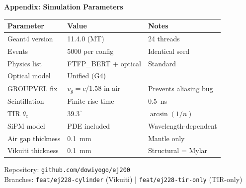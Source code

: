 \documentclass[aspectratio=169,10pt]{beamer}
\begin{document}
\begin{frame}[plain]
  \begin{center}
    \Large\textbf{Appendix: Simulation Parameters}
  \end{center}

  \renewcommand{\arraystretch}{1.2}
  \begin{tabular}{@{}lll@{}}
    \toprule
    Parameter & Value & Notes \\
    \midrule
    Geant4 version   & 11.4.0 (MT) & 24 threads \\
    Events           & 5000 per config & Identical seed \\
    Physics list     & FTFP\_BERT + optical & Standard \\
    Optical model    & Unified (G4) & \\
    GROUPVEL fix     & $v_g = c/1.58$ in air & Prevents aliasing bug \\
    Scintillation    & Finite rise time & \SI{0.5}{ns} \\
    TIR $\theta_c$   & $39.3^\circ$ & $\arcsin(1/n)$ \\
    SiPM model       & PDE included & Wavelength-dependent \\
    Air gap thickness & \SI{0.1}{mm} & Mantle only \\
    Vikuiti thickness & \SI{0.1}{mm} & Structural = Mylar \\
    \bottomrule
  \end{tabular}

\vspace{1em}
{\footnotesize
Repository: \texttt{github.com/dowiyogo/ej200} \\
Branches: \texttt{feat/ej228-cylinder} (Vikuiti) |
          \texttt{feat/ej228-tir-only} (TIR-only)
}

\end{frame}
\end{document}
